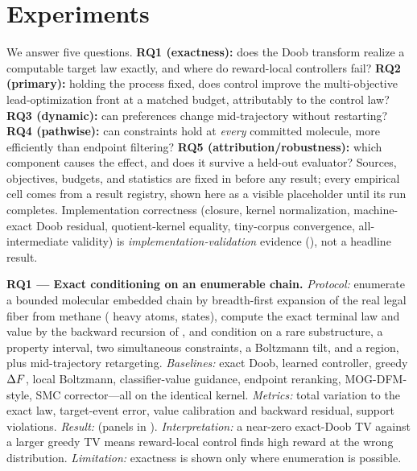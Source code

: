 \section{Experiments}
\label{sec:experiments}

We answer five questions. \textbf{RQ1 (exactness):} does the Doob transform realize a computable target
law exactly, and where do reward-local controllers fail? \textbf{RQ2 (primary):} holding the process
fixed, does control improve the multi-objective lead-optimization front at a matched budget, attributably
to the control law? \textbf{RQ3 (dynamic):} can preferences change mid-trajectory without restarting?
\textbf{RQ4 (pathwise):} can constraints hold at \emph{every} committed molecule, more efficiently than
endpoint filtering? \textbf{RQ5 (attribution/robustness):} which component causes the effect, and does it
survive a held-out evaluator? Sources, objectives, budgets, and statistics are fixed in
 before any result; every empirical cell comes from a result registry, shown here as a
visible placeholder until its run completes. Implementation correctness (closure, kernel normalization,
machine-exact Doob residual, quotient-kernel equality, tiny-corpus convergence, all-intermediate
validity) is \emph{implementation-validation} evidence (), not a headline result.

\textbf{RQ1 --- Exact conditioning on an enumerable chain.} \textit{Protocol:} enumerate a bounded
molecular embedded chain by breadth-first expansion of the real legal fiber from methane
( heavy atoms,  states), compute the exact
terminal law and value by the backward recursion of , and condition on a rare substructure, a property
interval, two simultaneous constraints, a Boltzmann tilt, and a region, plus mid-trajectory retargeting.
\textit{Baselines:} exact Doob, learned controller, greedy $\Delta F$, local Boltzmann,
classifier-value guidance, endpoint reranking, MOG-DFM-style, SMC corrector---all on the identical
kernel. \textit{Metrics:} total variation to the exact law, target-event error, value calibration and
backward residual, support violations. \textit{Result:}  (panels in
). \textit{Interpretation:} a near-zero exact-Doob TV against a larger greedy TV
means reward-local control finds high reward at the wrong distribution. \textit{Limitation:} exactness is
shown only where enumeration is possible.

